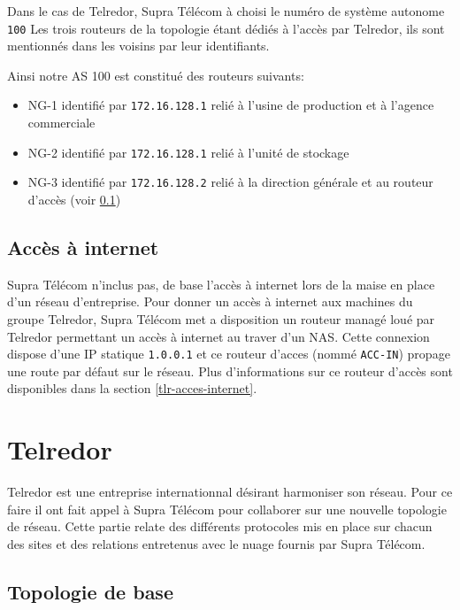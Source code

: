\documentclass{article}
\newcommand{\tlr}{Telredor\xspace}
\newcommand{\spr}{Supra Télécom\xspace}
\begin{document}
Dans le cas de \tlr, \spr à choisi le numéro de système autonome \texttt{100}
Les trois routeurs de la topologie étant dédiés à l'accès par \tlr, ils sont mentionnés dans les voisins par leur identifiants.

Ainsi notre AS 100 est constitué des routeurs suivants:

\bigskip

\begin{itemize}
	\item NG-1 identifié par \texttt{172.16.128.1} relié à l'usine de production et à l'agence commerciale
	\item NG-2 identifié par \texttt{172.16.128.1} relié à l'unité de stockage
	\item NG-3 identifié par \texttt{172.16.128.2} relié à la direction générale et au routeur d'accès (voir \ref{acces-internet})
\end{itemize}

\bigskip

\subsection{Accès à internet}
\label{acces-internet}

\spr n'inclus pas, de base l'accès à internet lors de la maise en place d'un réseau d'entreprise.
Pour donner un accès à internet aux machines du groupe \tlr, \spr met a disposition un routeur managé loué par \tlr permettant un accès à internet au traver d'un NAS.
Cette connexion dispose d'une IP statique \texttt{1.0.0.1} et ce routeur d'acces (nommé \texttt{ACC-IN}) propage une route par défaut sur le réseau.
Plus d'informations sur ce routeur d'accès sont disponibles dans la section \ref{tlr-acces-internet}.

\section{\tlr}

\tlr est une entreprise internationnal désirant harmoniser son réseau.
Pour ce faire il ont fait appel à \spr pour collaborer sur une nouvelle topologie de réseau.
Cette partie relate des différents protocoles mis en place sur chacun des sites et des relations entretenus avec le nuage fournis par \spr.

\subsection{Topologie de base}
\end{document}
